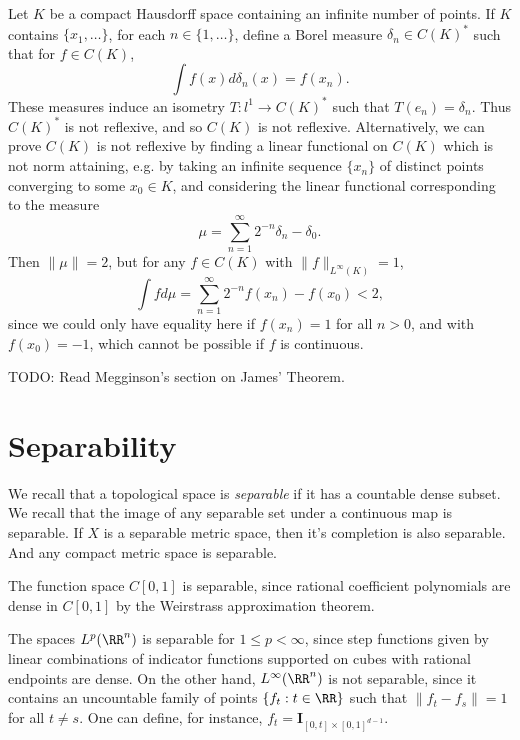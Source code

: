 \begin{example}
    Let $K$ be a compact Hausdorff space containing an infinite number of points. If $K$ contains $\{ x_1, \dots \}$, for each $n \in \{ 1, \dots \}$, define a Borel measure $\delta_n \in C(K)^*$ such that for $f \in C(K)$,
    \[ \int f(x) d \delta_n(x) = f(x_n). \]
    These measures induce an isometry $T: l^1 \to C(K)^*$ such that $T(e_n) = \delta_n$. Thus $C(K)^*$ is not reflexive, and so $C(K)$ is not reflexive. Alternatively, we can prove $C(K)$ is not reflexive by finding a linear functional on $C(K)$ which is not norm attaining, e.g. by taking an infinite sequence $\{ x_n \}$ of distinct points converging to some $x_0 \in K$, and considering the linear functional corresponding to the measure
    \[ \mu = \sum_{n = 1}^\infty 2^{-n} \delta_n - \delta_0. \]
    Then $\| \mu \| = 2$, but for any $f \in C(K)$ with $\| f \|_{L^\infty(K)} = 1$,
    \[ \int f d\mu = \sum_{n = 1}^\infty 2^{-n} f(x_n) - f(x_0) < 2, \]
    since we could only have equality here if $f(x_n) = 1$ for all $n > 0$, and with $f(x_0) = -1$, which cannot be possible if $f$ is continuous.
\end{example}

TODO: Read Megginson's section on James' Theorem.







\section{Separability}

We recall that a topological space is \emph{separable} if it has a countable dense subset. We recall that the image of any separable set under a continuous map is separable. If $X$ is a separable metric space, then it's completion is also separable. And any compact metric space is separable.

\begin{example}
    The function space $C[0,1]$ is separable, since rational coefficient polynomials are dense in $C[0,1]$ by the Weirstrass approximation theorem.
\end{example}

\begin{example}
    The spaces $L^p(\RR^n)$ is separable for $1 \leq p < \infty$, since step functions given by linear combinations of indicator functions supported on cubes with rational endpoints are dense. On the other hand, $L^\infty(\RR^n)$ is not separable, since it contains an uncountable family of points $\{ f_t : t \in \RR \}$ such that $\| f_t - f_s \| = 1$ for all $t \neq s$. One can define, for instance, $f_t = \mathbf{I}_{[0,t] \times [0,1]^{d-1}}$.
\end{example}

